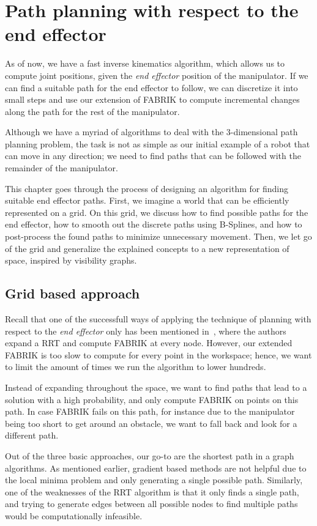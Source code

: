 \chapter{Path planning with respect to the end effector}

As of now, we have a fast inverse kinematics algorithm, which allows us to compute joint positions, given the \textit{end effector} position of the manipulator. If we can find a suitable path for the end effector to follow, we can discretize it into small steps and use our extension of FABRIK to compute incremental changes along the path for the rest of the manipulator.

Although we have a myriad of algorithms to deal with the 3-dimensional path planning problem, the task is not as simple as our initial example of a robot that can move in any direction; we need to find paths that can be followed with the remainder of the manipulator.

This chapter goes through the process of designing an algorithm for finding suitable end effector paths. First, we imagine a world that can be efficiently represented on a grid. On this grid, we discuss how to find possible paths for the end effector, how to smooth out the discrete paths using B-Splines, and how to post-process the found paths to minimize unnecessary movement. Then, we let go of the grid and generalize the explained concepts to a new representation of space, inspired by visibility graphs.

\section{Grid based approach}

Recall that one of the successfull ways of applying the technique of planning with respect to the \textit{end effector} only has been mentioned in~\cite{rrt_fabrik}, where the authors expand a RRT and compute FABRIK at every node. However, our extended FABRIK is too slow to compute for every point in the workspace; hence, we want to limit the amount of times we run the algorithm to lower hundreds.

Instead of expanding throughout the space, we want to find paths that lead to a solution with a high probability, and only compute FABRIK on points on this path. In case FABRIK fails on this path, for instance due to the manipulator being too short to get around an obstacle, we want to fall back and look for a different path.

Out of the three basic approaches, our go-to are the shortest path in a graph algorithms. As mentioned earlier, gradient based methods are not helpful due to the local minima problem and only generating a single possible path. Similarly, one of the weaknesses of the RRT algorithm is that it only finds a single path, and trying to generate edges between all possible nodes to find multiple paths would be computationally infeasible.

